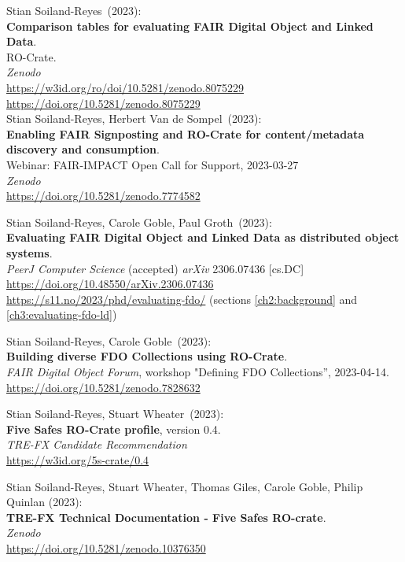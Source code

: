 \begin{thebibliography}{9}
Stian Soiland-Reyes~(2023): \\
\textbf{Comparison tables for evaluating FAIR Digital Object and Linked Data}.\\
RO-Crate. \\
\emph{Zenodo}\\
\url{https://w3id.org/ro/doi/10.5281/zenodo.8075229}\\
\url{https://doi.org/10.5281/zenodo.8075229}\\

Stian Soiland-Reyes, Herbert Van de Sompel~(2023): \\
\textbf{Enabling FAIR Signposting and RO-Crate for content/metadata discovery and consumption}.\\
Webinar: FAIR-IMPACT Open Call for Support, 2023-03-27 \\
\emph{Zenodo} \\
\url{https://doi.org/10.5281/zenodo.7774582}

Stian Soiland-Reyes, Carole Goble, Paul Groth~(2023): \\
\textbf{Evaluating FAIR Digital Object and Linked Data as distributed object systems}.\\
\emph{PeerJ Computer Science} (accepted)  
\emph{arXiv} 2306.07436 [cs.DC]  
\url{https://doi.org/10.48550/arXiv.2306.07436}\\
\url{https://s11.no/2023/phd/evaluating-fdo/}
(sections \vref{ch2:background} and \vref{ch3:evaluating-fdo-ld})

Stian Soiland-Reyes, Carole Goble~(2023): \\
\textbf{Building diverse FDO Collections using RO-Crate}.\\
\emph{FAIR Digital Object Forum}, workshop "Defining FDO Collections”, 2023-04-14.\\
\url{https://doi.org/10.5281/zenodo.7828632}

Stian Soiland-Reyes, Stuart Wheater~(2023): \\
\textbf{Five Safes RO-Crate profile}, version 0.4.\\
\emph{TRE-FX Candidate Recommendation} \\
\url{https://w3id.org/5s-crate/0.4}

Stian Soiland-Reyes, Stuart Wheater, Thomas Giles, Carole Goble, Philip Quinlan (2023):\\ 
\textbf{TRE-FX Technical Documentation - Five Safes RO-crate}.  \\
\emph{Zenodo} \\
\url{https://doi.org/10.5281/zenodo.10376350}


\end{thebibliography}

